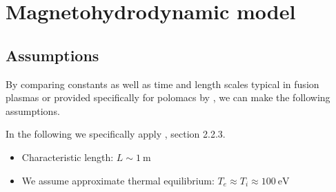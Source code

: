 \section{Magnetohydrodynamic model}

\subsection{Assumptions}

By comparing constants as well as time and length scales typical in fusion plasmas or provided specifically for polomacs by \cite{Elio2024}, we can make the following assumptions.

In the following we specifically apply  \cite{Freidberg2014}, section 2.2.3.

\begin{itemize}
    \item Characteristic length: $L \sim \SI{1}{\meter}$
    \item We assume approximate thermal equilibrium: $T_e \approx T_i \approx \SI{100}{\electronvolt}$
\end{itemize}


